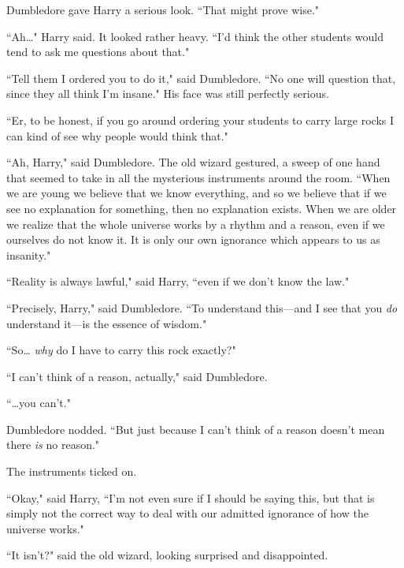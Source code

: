 Dumbledore gave Harry a serious look. ``That might prove wise."

``Ah{\ldots}" Harry said. It looked rather heavy. ``I'd think the other students would tend to ask me questions about that."

``Tell them I ordered you to do it," said Dumbledore. ``No one will question that, since they all think I'm insane." His face was still perfectly serious.

``Er, to be honest, if you go around ordering your students to carry large rocks I can kind of see why people would think that."

``Ah, Harry," said Dumbledore. The old wizard gestured, a sweep of one hand that seemed to take in all the mysterious instruments around the room. ``When we are young we believe that we know everything, and so we believe that if we see no explanation for something, then no explanation exists. When we are older we realize that the whole universe works by a rhythm and a reason, even if we ourselves do not know it. It is only our own ignorance which appears to us as insanity."

``Reality is always lawful," said Harry, ``even if we don't know the law."

``Precisely, Harry," said Dumbledore. ``To understand this—and I see that you \emph{do} understand it—is the essence of wisdom."

``So{\ldots} \emph{why} do I have to carry this rock exactly?"

``I can't think of a reason, actually," said Dumbledore.

``{\ldots}you can't."

Dumbledore nodded. ``But just because I can't think of a reason doesn't mean there \emph{is} no reason."

The instruments ticked on.

``Okay," said Harry, ``I'm not even sure if I should be saying this, but that is simply not the correct way to deal with our admitted ignorance of how the universe works."

``It isn't?" said the old wizard, looking surprised and disappointed.

